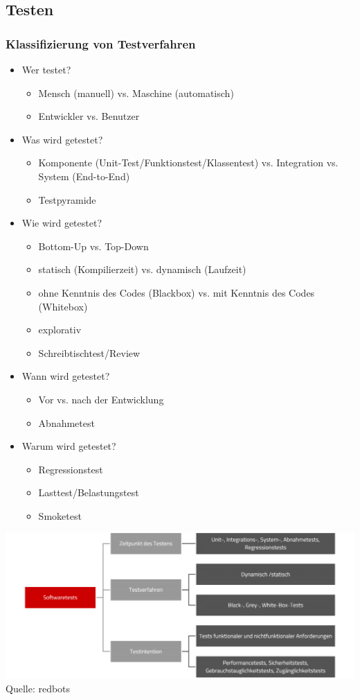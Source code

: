 \clearpage

\subsection{Testen}
\label{sec:Testen}

\subsubsection{Klassifizierung von Testverfahren}
\label{sec:KlassifizierungTestverfahren}

\begin{multicols}{2}
	\begin{itemize}
		\item Wer testet?
		\begin{itemize}
			\item Mensch (manuell) vs. Maschine (automatisch)
			\item Entwickler vs. Benutzer
		\end{itemize}
		\item Was wird getestet?
		\begin{itemize}
			\item Komponente (Unit-Test/Funktionstest/Klassentest) vs. Integration vs. System (End-to-End)
			\item Testpyramide
		\end{itemize}
		\item Wie wird getestet?
		\begin{itemize}
			\item Bottom-Up vs. Top-Down
			\item statisch (Kompilierzeit) vs. dynamisch (Laufzeit)
			\item ohne Kenntnis des Codes (Blackbox) vs. mit Kenntnis des Codes (Whitebox)
			\item explorativ
			\item Schreibtischtest/Review
		\end{itemize}
		\item Wann wird getestet?
		\begin{itemize}
			\item Vor vs. nach der Entwicklung
			\item Abnahmetest
		\end{itemize}
		\item Warum wird getestet?
		\begin{itemize}
			\item Regressionstest
			\item Lasttest/Belastungstest
			\item Smoketest
		\end{itemize}
	\end{itemize}
\end{multicols}

\begin{center}
	\includegraphics[scale=.32]{Bilder/TestsKlassifizierung.png}
	Quelle: redbots \cite{testKlassifizierung}
\end{center}
